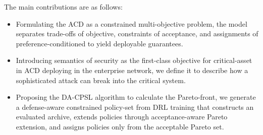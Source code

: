 \documentclass[sigconf,review,anonymous]{acmart}
\begin{document}


The main contributions are as follows:
\begin{itemize}
    \item Formulating the ACD as a constrained multi-objective problem, the model separates trade-offs of objective, constraints of acceptance, and assignments of preference-conditioned to yield deployable guarantees.
    \item Introducing semantics of security as the first-class objective for critical-asset
     in ACD deploying in the enterprise network, we define it to describe how a sophisticated attack can break into the critical system.
    \item Proposing the DA-CPSL algorithm to calculate the Pareto-front, we generate a defense-aware constrained policy-set from DRL training that constructs an evaluated archive, extends policies through acceptance-aware Pareto extension, and assigns policies only from the acceptable Pareto set.
\end{itemize}
\end{document}
